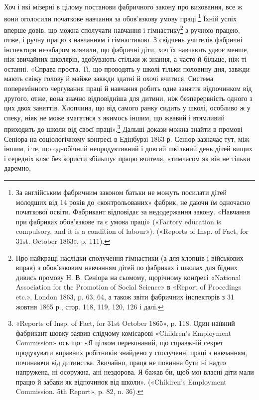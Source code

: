 Хоч і які мізерні в цілому постанови фабричного закону про
виховання, все ж вони оголосили початкове навчання за обов’язкову
умову праці.\footnote{
За англійським фабричним законом батьки не можуть посилати
дітей молодших від 14 років до «контрольованих» фабрик, не даючи
їм одночасно початкової освіти. Фабрикант відповідає за недодержання
закону. «Навчання при фабриках обов'язкове та є умова праці» («Factory
education is compulsory, and it is a condition of labour»). («Reports of
Insp. of Fact, for 31st. October 1863», p. 111).
} Їхній успіх вперше довів, що можна сполучати
навчання і гімнастику\footnote{
Про найкращі наслідки сполучення гімнастики (а для хлопців
і військових вправ) з обов’язковим навчанням дітей по фабриках і школах
для бідних дивись промову Н. В. Сеніора на сьомому, щорічному конґресі
«National Association for the Promotion of Social Science» в «Report
of Procedings etc.», London 1863, p. 63, 64, а також звіти фабричних інспекторів
з 31 жовтня 1865 р., стор. 118, 119, 120, 126 і далі.
} з ручною працею, отже, і ручну
працю з навчанням і гімнастикою. З свідчень учителів фабричні
інспектори незабаром виявили, що фабричні діти, хоч їх навчають
удвоє менше, ніж звичайних школярів, здобувають стільки ж
знання, а часто й більше, ніж ті останні. «Справа проста. Ті, що
проводять у школі тільки половину дня, завжди мають свіжу
голову й майже завжди здатні й охочі вчитися. Система поперемінного
чергування праці й навчання робить одне заняття відпочинком
від другого, отже, вона значно відповідніша для дитини,
ніж безперервність одного з цих двох заняттів. Хлопчина, що від
самого ранку сидить у школі, особливо ж у спеку, ніяк не може
змагатися з якимось іншим, що жвавий і втямливий приходить до
школи від своєї праці».\footnote{
«Reports of Insp. of Fact, for 31st October 1865», p. 118. Один
наївний фабрикант шовку заявив слідчому комісарові «Children’s Employment
Commission» ось що: «Я цілком переконаний, що справжній секрет
продукувати вправних робітників знайдено у сполученні праці з навчанням,
починаючи від дитинства. Звичайно, праця не повинна бути ні
надто напружена, ні осоружна, ані нездорова. Я бажав би, щоб мої
власні діти мали працю й забави як відпочинок від школи». («Children’s
Employment Commission. 5th Report», p. 82, n. 36).
} Дальші докази можна знайти в промові
Сеніора на соціологічному конґресі в Едінбурзі 1863 р. Сеніор
зазначає тут, між іншим, і те, що однобічний непродуктивний і
довгий шкільний день дітей вищих і середніх кляс без користи
збільшує працю вчителя, «тимчасом як він не тільки даремно,
